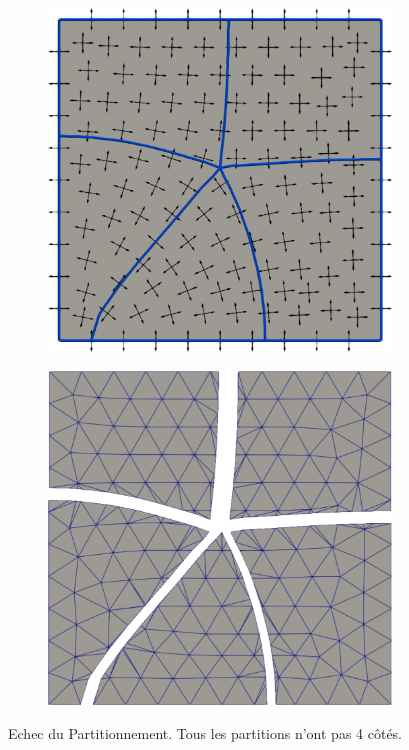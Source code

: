\begin{figure}[h!]
\centering
\begin{subfigure}{0.49\textwidth}
    \includegraphics[width=\textwidth]{images/echec_partitionnement_1.pdf}
\end{subfigure}
\hfill
\begin{subfigure}{0.49\textwidth}
    \includegraphics[width=\textwidth]{images/echec_partitionnement_2.pdf}
\end{subfigure}
\caption{Echec du Partitionnement. Tous les partitions n'ont pas 4 côtés.}
\label{fig:echec_partitionnement}
\end{figure}


